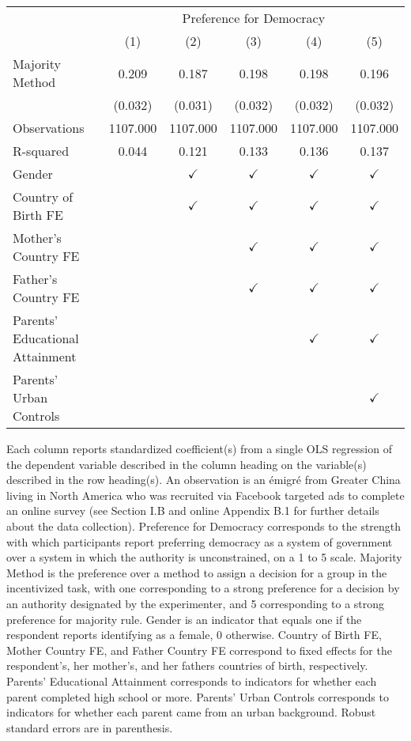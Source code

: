 \begin{tabular}{l*{5}{c}}
\hline\hline
                &\multicolumn{5}{c}{Preference for Democracy}     \\\cmidrule(lr){2-6}
                &\multicolumn{1}{c}{(1)}&\multicolumn{1}{c}{(2)}&\multicolumn{1}{c}{(3)}&\multicolumn{1}{c}{(4)}&\multicolumn{1}{c}{(5)}\\
\hline
Majority Method &    0.209&    0.187&    0.198&    0.198&    0.196\\
                &  (0.032)&  (0.031)&  (0.032)&  (0.032)&  (0.032)\\
\hline
Observations    & 1107.000& 1107.000& 1107.000& 1107.000& 1107.000\\
R-squared       &    0.044&    0.121&    0.133&    0.136&    0.137\\
Gender          &         &$\checkmark$&$\checkmark$&$\checkmark$&$\checkmark$\\
Country of Birth FE&         &$\checkmark$&$\checkmark$&$\checkmark$&$\checkmark$\\
Mother's Country FE&         &         &$\checkmark$&$\checkmark$&$\checkmark$\\
Father's Country FE&         &         &$\checkmark$&$\checkmark$&$\checkmark$\\
Parents' Educational Attainment&         &         &         &$\checkmark$&$\checkmark$\\
Parents' Urban Controls&         &         &         &         &$\checkmark$\\
        \hline\hline        \end{tabular}            \begin{adjustwidth}{-1cm}{-1cm}            \begin{scriptsize}        Each column reports standardized coefficient(s) from a single OLS regression of the dependent variable described in the column heading on the variable(s) described in the row heading(s). An observation is an émigré from Greater China living in North America who was recruited via Facebook targeted ads to complete an online survey (see Section I.B and online Appendix B.1 for further details about the data collection). Preference for Democracy corresponds to the strength with which participants report preferring democracy as a system of government over a system in which the authority is unconstrained, on a 1 to 5 scale. Majority Method is the preference over a method to assign a decision for a group in the incentivized task, with one corresponding to a strong preference for a decision by an authority designated by the experimenter, and 5 corresponding to a strong preference for majority rule. Gender is an indicator that equals one if the respondent reports identifying as a female, 0 otherwise. Country of Birth FE, Mother Country FE, and Father Country FE correspond to fixed effects for the respondent's, her mother's, and her fathers countries of birth, respectively. Parents' Educational Attainment corresponds to indicators for whether each parent completed high school or more. Parents' Urban Controls corresponds to indicators for whether each parent came from an urban background. Robust standard errors are in parenthesis.        \end{scriptsize} \end{adjustwidth}
